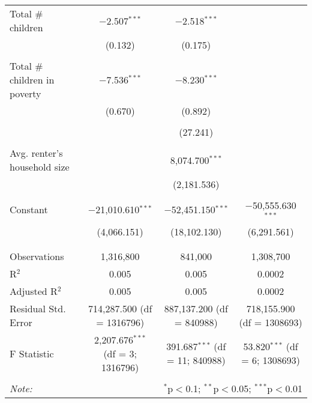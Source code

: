 \begin{table}[!htbp]
\begin{tabular}{@{\extracolsep{5pt}}lccc}
 Total # children & $-$2.507$^{***}$ & $-$2.518$^{***}$ &  \\ 
  & (0.132) & (0.175) &  \\ 
  & & & \\ 
 Total # children in poverty & $-$7.536$^{***}$ & $-$8.230$^{***}$ &  \\ 
  & (0.670) & (0.892) &  \\ 
  & & & \\ 
  &  & (27.241) &  \\ 
  & & & \\ 
 Avg. renter's household size &  & 8,074.700$^{***}$ &  \\ 
  &  & (2,181.536) &  \\ 
  & & & \\ 
 Constant & $-$21,010.610$^{***}$ & $-$52,451.150$^{***}$ & $-$50,555.630$^{***}$ \\ 
  & (4,066.151) & (18,102.130) & (6,291.561) \\ 
  & & & \\ 
\hline \\[-1.8ex] 
Observations & 1,316,800 & 841,000 & 1,308,700 \\ 
R$^{2}$ & 0.005 & 0.005 & 0.0002 \\ 
Adjusted R$^{2}$ & 0.005 & 0.005 & 0.0002 \\ 
Residual Std. Error & 714,287.500 (df = 1316796) & 887,137.200 (df = 840988) & 718,155.900 (df = 1308693) \\ 
F Statistic & 2,207.676$^{***}$ (df = 3; 1316796) & 391.687$^{***}$ (df = 11; 840988) & 53.820$^{***}$ (df = 6; 1308693) \\ 
\hline 
\hline \\[-1.8ex] 
\textit{Note:}  & \multicolumn{3}{r}{$^{*}$p$<$0.1; $^{**}$p$<$0.05; $^{***}$p$<$0.01} \\ 
\end{tabular} 
\end{table} 
